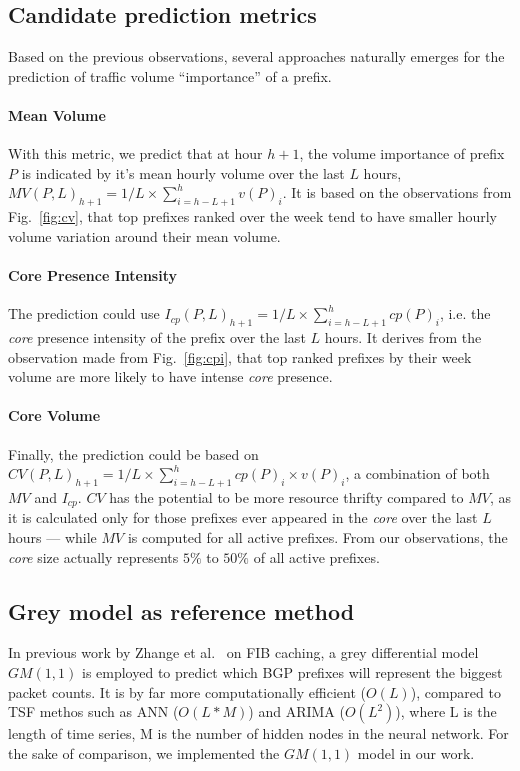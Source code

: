 \subsection{Candidate prediction metrics}

Based on the previous observations, several approaches naturally emerges for the prediction of traffic volume ``importance'' of a prefix.
\paragraph*{Mean Volume}
With this metric, we predict that at hour $h+1$, the volume importance of prefix $P$ is indicated by it's mean hourly volume over the last $L$ hours, $MV(P,L)_{h+1} = 1/L \times \sum_{i = h-L+1}^{h} v(P)_i$.
It is based on the observations from Fig.~\ref{fig:cv}, that top prefixes ranked over the week tend to have smaller hourly volume variation around their mean volume.

\paragraph*{Core Presence Intensity}
The prediction could use $I_{cp}(P,L)_{h+1} = 1/L \times \sum_{i = h-L+1}^{h} cp(P)_i$, i.e. the \textit{core} presence intensity of the prefix over the last $L$ hours. It derives from the observation made from Fig.~\ref{fig:cpi}, that top ranked prefixes by their week volume are more likely to have intense \textit{core} presence.

\paragraph*{Core Volume}
Finally, the prediction could be based on $CV(P,L)_{h+1} = 1/L \times \sum_{i = h-L+1}^{h} cp(P)_i \times v(P)_i$,  a combination of both $MV$ and $I_{cp}$.
$CV$ has the potential to be more resource thrifty compared to $MV$, as it is calculated only for those prefixes ever appeared in the \textit{core} over the last $L$ hours --- while $MV$ is computed for all active prefixes. From our observations, the \textit{core} size actually represents $5\%$ to $50\%$ of all active prefixes.

\subsection{Grey model as reference method}
In previous work by Zhange et al.\ \cite{Zhang2012} on FIB caching, a grey differential model $GM(1,1)$ \cite{Julong1989} is employed to predict which BGP prefixes will represent the  biggest packet counts. 
It is by far more computationally efficient ($O(L)$), compared to \ac{TSF} methos such as \ac{ANN} ($O(L*M)$) and \ac{ARIMA} ($O(L^2)$), where L is the length of time series, M is the number of hidden nodes in the neural network.
For the sake of comparison, we implemented the $GM(1,1)$ model in our work. 

